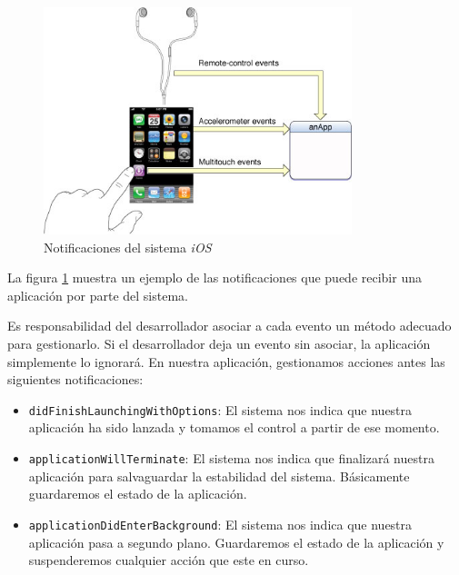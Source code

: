  \begin{figure} [h]
  \centering
    \includegraphics[width=0.8\textwidth]{./images/events_to_app.jpg}
  \caption{Notificaciones del sistema \emph{iOS} }
  \label{fig:iOSnotify}
\end{figure}

 La figura \ref{fig:iOSnotify} muestra un ejemplo de las notificaciones que puede recibir una aplicación por parte del sistema.
 
    Es responsabilidad del desarrollador asociar a cada evento un método adecuado para gestionarlo. Si el desarrollador deja un evento sin asociar, la aplicación simplemente lo ignorará. En nuestra aplicación, gestionamos acciones antes las siguientes notificaciones:
    
\begin{itemize}
	\item \lstinline{didFinishLaunchingWithOptions}: El sistema nos indica que nuestra aplicación ha sido lanzada y tomamos el control a partir de ese momento. 
 	\item \lstinline{applicationWillTerminate}: El sistema nos indica que finalizará nuestra aplicación para salvaguardar la estabilidad del sistema. Básicamente guardaremos el estado de la aplicación.
	\item \lstinline{applicationDidEnterBackground}: El sistema nos indica que nuestra aplicación pasa a segundo plano. Guardaremos el estado de la aplicación y suspenderemos cualquier acción que este en curso.
\end{itemize} 
    
    
